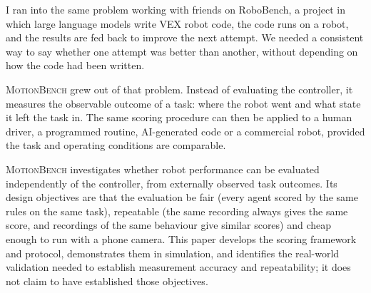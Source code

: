\documentclass[11pt]{article}
\newcommand{\mb}{\textsc{MotionBench}}
\begin{document}
I ran into the same problem working with friends on RoboBench, a project in which large language
models write VEX robot code, the code runs on a robot, and the results are fed back to improve the
next attempt. We needed a consistent way to say whether one attempt was better than another, without
depending on how the code had been written.

\mb{} grew out of that problem. Instead of evaluating the controller, it measures the observable
outcome of a task: where the robot went and what state it left the task in. The same scoring
procedure can then be applied to a human driver, a programmed routine, AI-generated code or a
commercial robot, provided the task and operating conditions are comparable.

\mb{} investigates whether robot performance can be evaluated independently of the controller,
from externally observed task outcomes. Its design objectives are that the evaluation be fair
(every agent scored by the same rules on the same task), repeatable (the same recording always
gives the same score, and recordings of the same behaviour give similar scores) and cheap enough to
run with a phone camera. This paper develops the scoring framework and protocol, demonstrates them
in simulation, and identifies the real-world validation needed to establish measurement accuracy
and repeatability; it does not claim to have established those objectives.
\end{document}
